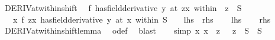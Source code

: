 \begin{isabellebody}
\isamarkupfalse%
%
\endisatagproof
{\isafoldproof}%
%
\isadelimproof
\isanewline
%
\endisadelimproof
\isanewline
{}\isamarkupfalse%
\ DERIV{\isacharunderscore}{\kern0pt}at{\isacharunderscore}{\kern0pt}within{\isacharunderscore}{\kern0pt}shift{\isacharcolon}{\kern0pt}\isanewline
\ \ {\isachardoublequoteopen}{\isacharparenleft}{\kern0pt}f\ has{\isacharunderscore}{\kern0pt}field{\isacharunderscore}{\kern0pt}derivative\ y{\isacharparenright}{\kern0pt}\ {\isacharparenleft}{\kern0pt}at\ {\isacharparenleft}{\kern0pt}z{\isacharplus}{\kern0pt}x{\isacharparenright}{\kern0pt}\ within\ {\isacharparenleft}{\kern0pt}{\isacharplus}{\kern0pt}{\isacharparenright}{\kern0pt}\ z\ {\isacharbackquote}{\kern0pt}\ S{\isacharparenright}{\kern0pt}\ {\isasymlongleftrightarrow}\ \isanewline
\ \ \ {\isacharparenleft}{\kern0pt}{\isacharparenleft}{\kern0pt}{\isasymlambda}x{\isachardot}{\kern0pt}\ f\ {\isacharparenleft}{\kern0pt}z{\isacharplus}{\kern0pt}x{\isacharparenright}{\kern0pt}{\isacharparenright}{\kern0pt}\ has{\isacharunderscore}{\kern0pt}field{\isacharunderscore}{\kern0pt}derivative\ y{\isacharparenright}{\kern0pt}\ {\isacharparenleft}{\kern0pt}at\ x\ within\ S{\isacharparenright}{\kern0pt}{\isachardoublequoteclose}\ \ \ {\isacharparenleft}{\kern0pt}\ {\isachardoublequoteopen}{\isacharquery}{\kern0pt}lhs\ {\isacharequal}{\kern0pt}\ {\isacharquery}{\kern0pt}rhs{\isachardoublequoteclose}{\isacharparenright}{\kern0pt}\isanewline
%
\isadelimproof
%
\endisadelimproof
%
\isatagproof
{}\isamarkupfalse%
\isanewline
\ \ \isamarkupfalse%
\ {\isacharquery}{\kern0pt}lhs\ \isamarkupfalse%
\ \isamarkupfalse%
\ {\isacharquery}{\kern0pt}rhs\isanewline
\ \ \ \ \isamarkupfalse%
\ DERIV{\isacharunderscore}{\kern0pt}at{\isacharunderscore}{\kern0pt}within{\isacharunderscore}{\kern0pt}shift{\isacharunderscore}{\kern0pt}lemma\ \isamarkupfalse%
\ o{\isacharunderscore}{\kern0pt}def\ \isamarkupfalse%
\ blast\isanewline
{}\isamarkupfalse%
\isanewline
\ \ \isamarkupfalse%
\ {\isacharbrackleft}{\kern0pt}simp{\isacharbrackright}{\kern0pt}{\isacharcolon}{\kern0pt}\ {\isachardoublequoteopen}{\isacharparenleft}{\kern0pt}{\isasymlambda}x{\isachardot}{\kern0pt}\ x\ {\isacharminus}{\kern0pt}\ z{\isacharparenright}{\kern0pt}\ {\isacharbackquote}{\kern0pt}\ {\isacharparenleft}{\kern0pt}{\isacharplus}{\kern0pt}{\isacharparenright}{\kern0pt}\ z\ {\isacharbackquote}{\kern0pt}\ S\ {\isacharequal}{\kern0pt}\ S{\isachardoublequoteclose}\isanewline

\end{isabellebody}
